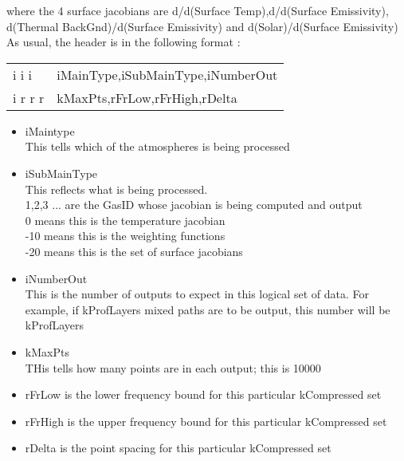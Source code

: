 \documentclass[12pt]{article}
\newlength{\colwidth}
\begin{document}
{{{{where the 4 surface jacobians are d/d(Surface Temp),d/d(Surface Emissivity),
d(Thermal BackGnd)/d(Surface Emissivity) and d(Solar)/d(Surface Emissivity)\\

As usual, the header is in the following format : 
\begin{longtable}{lp{\colwidth}}
{\sf i i i}    & iMainType,iSubMainType,iNumberOut\\
{\sf i r r r } & kMaxPts,rFrLow,rFrHigh,rDelta \\
\end{longtable}

\begin{itemize}
\item iMaintype\\
      This tells which of the atmospheres is being processed\\

\item iSubMainType \\
      This reflects what is being processed. \\
      1,2,3 ... are the GasID whose jacobian is being computed and output\\
      0  means this is the temperature jacobian\\
      -10 means this is the weighting functions\\
      -20 means this is the set of surface jacobians\\

\item iNumberOut\\
      This is the number of outputs to expect in this logical set of data. 
      For example, if kProfLayers mixed paths are to be output, this number 
      will be kProfLayers\\      

\item kMaxPts\\
      THis tells how many points are in each output; this is 10000\\

\item rFrLow is the lower frequency bound for this particular kCompressed set\\

\item rFrHigh is the upper frequency bound for this particular kCompressed 
      set\\

\item rDelta is the point spacing for this particular kCompressed set\\


\end{itemize}}}}}
\end{document}
